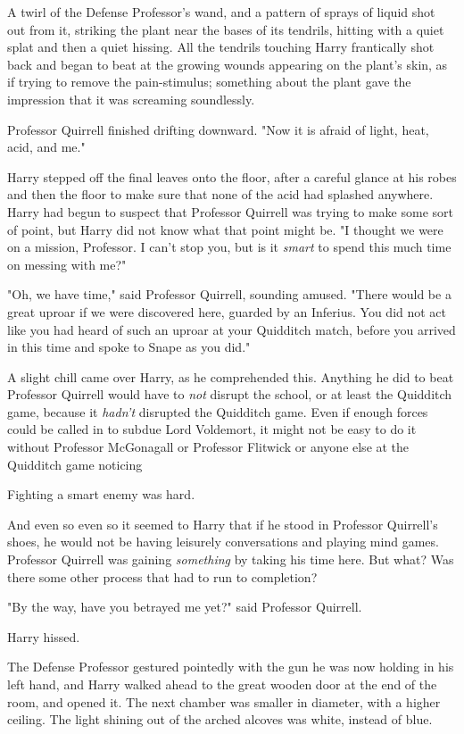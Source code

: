 A twirl of the Defense Professor's wand, and a pattern of sprays of liquid shot
out from it, striking the plant near the bases of its tendrils, hitting with a
quiet splat and then a quiet hissing. All the tendrils touching Harry
frantically shot back and began to beat at the growing wounds appearing on the
plant's skin, as if trying to remove the pain-stimulus; something about the
plant gave the impression that it was screaming soundlessly.

Professor Quirrell finished drifting downward. "Now it is afraid of light,
heat, acid, and me."

Harry stepped off the final leaves onto the floor, after a careful glance at
his robes and then the floor to make sure that none of the acid had splashed
anywhere. Harry had begun to suspect that Professor Quirrell was trying to make
some sort of point, but Harry did not know what that point might be. "I thought
we were on a mission, Professor. I can't stop you, but is it \emph{smart} to
spend this much time on messing with me?"

"Oh, we have time," said Professor Quirrell, sounding amused. "There would be a
great uproar if we were discovered here, guarded by an Inferius. You did not
act like you had heard of such an uproar at your Quidditch match, before you
arrived in this time and spoke to Snape as you did."

A slight chill came over Harry, as he comprehended this. Anything he did to
beat Professor Quirrell would have to \emph{not} disrupt the school, or at
least the Quidditch game, because it \emph{hadn't} disrupted the Quidditch
game. Even if enough forces could be called in to subdue Lord Voldemort, it
might not be easy to do it without Professor McGonagall or Professor Flitwick
or anyone else at the Quidditch game noticing{\el}

Fighting a smart enemy was hard.

And even so{\el} even so it seemed to Harry that if he stood in Professor
Quirrell's shoes, he would not be having leisurely conversations and playing
mind games. Professor Quirrell was gaining \emph{something} by taking his time
here. But what? Was there some other process that had to run to completion?

"By the way, have you betrayed me yet?" said Professor Quirrell.

 Harry hissed.

The Defense Professor gestured pointedly with the gun he was now holding in his
left hand, and Harry walked ahead to the great wooden door at the end of the
room, and opened it.
\sbreak
The next chamber was smaller in diameter, with a higher ceiling. The light
shining out of the arched alcoves was white, instead of blue.

